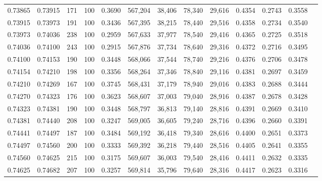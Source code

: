 \begin{tabular}{rrrrrrrrrrrrr}
0.73865 & 0.73915 &   171 & 100 &                                     0.3690 & 567,204 &  38,406 &  78,340 &  29,616 & 0.4354 & 0.2743 & 0.3558 \\
0.73915 & 0.73973 &   191 & 100 &                                     0.3436 & 567,395 &  38,215 &  78,440 &  29,516 & 0.4358 & 0.2734 & 0.3540 \\
0.73973 & 0.74036 &   238 & 100 &                                     0.2959 & 567,633 &  37,977 &  78,540 &  29,416 & 0.4365 & 0.2725 & 0.3518 \\
0.74036 & 0.74100 &   243 & 100 &                                     0.2915 & 567,876 &  37,734 &  78,640 &  29,316 & 0.4372 & 0.2716 & 0.3495 \\
0.74100 & 0.74153 &   190 & 100 &                                     0.3448 & 568,066 &  37,544 &  78,740 &  29,216 & 0.4376 & 0.2706 & 0.3478 \\
0.74154 & 0.74210 &   198 & 100 &                                     0.3356 & 568,264 &  37,346 &  78,840 &  29,116 & 0.4381 & 0.2697 & 0.3459 \\
0.74210 & 0.74269 &   167 & 100 &                                     0.3745 & 568,431 &  37,179 &  78,940 &  29,016 & 0.4383 & 0.2688 & 0.3444 \\
0.74270 & 0.74323 &   176 & 100 &                                     0.3623 & 568,607 &  37,003 &  79,040 &  28,916 & 0.4387 & 0.2678 & 0.3428 \\
0.74323 & 0.74381 &   190 & 100 &                                     0.3448 & 568,797 &  36,813 &  79,140 &  28,816 & 0.4391 & 0.2669 & 0.3410 \\
0.74381 & 0.74440 &   208 & 100 &                                     0.3247 & 569,005 &  36,605 &  79,240 &  28,716 & 0.4396 & 0.2660 & 0.3391 \\
0.74441 & 0.74497 &   187 & 100 &                                     0.3484 & 569,192 &  36,418 &  79,340 &  28,616 & 0.4400 & 0.2651 & 0.3373 \\
0.74497 & 0.74560 &   200 & 100 &                                     0.3333 & 569,392 &  36,218 &  79,440 &  28,516 & 0.4405 & 0.2641 & 0.3355 \\
0.74560 & 0.74625 &   215 & 100 &                                     0.3175 & 569,607 &  36,003 &  79,540 &  28,416 & 0.4411 & 0.2632 & 0.3335 \\
0.74625 & 0.74682 &   207 & 100 &                                     0.3257 & 569,814 &  35,796 &  79,640 &  28,316 & 0.4417 & 0.2623 & 0.3316 \\

\end{tabular}
